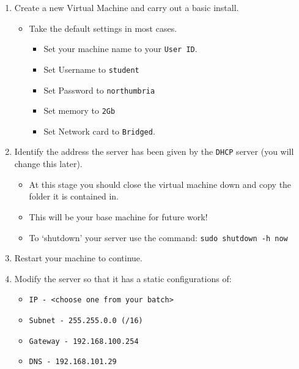 \documentclass[11pt]{article}
\begin{document}
\begin{enumerate}
    \item Create a new Virtual Machine and carry out a basic install.
        \begin{itemize}
            \item Take the default settings in most cases.
                \begin{itemize}
                    \item Set your machine name to your \texttt{User ID}.
                    \item Set Username to \texttt{student}
                    \item Set Password to \texttt{northumbria}
                    \item Set memory to \texttt{2Gb}
                    \item Set Network card to \texttt{Bridged}.
                \end{itemize}
        \end{itemize}
    \item Identify the address the server has been given by the \texttt{DHCP} server (you will change this later). 
        \begin{tcolorbox}[title={\textbf{Notes:}}]
            \begin{itemize}
                \item At this stage you should close the virtual machine down and copy the folder it is contained in. 
                \item This will be your base machine for future work!
                \item To `shutdown' your server use the command: \texttt{sudo shutdown -h now} 
            \end{itemize}
        \end{tcolorbox}
    \item Restart your machine to continue.
    \item Modify the server so that it has a static configurations of: 
        \begin{itemize}
            \item \texttt{IP - <choose one from your batch>}
            \item \texttt{Subnet - 255.255.0.0 (/16)}
            \item \texttt{Gateway - 192.168.100.254}
            \item \texttt{DNS - 192.168.101.29}
        \end{itemize}

\end{enumerate}
\end{document}
